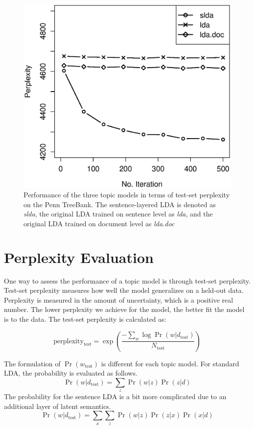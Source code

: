 \begin{figure}[!ht]
  \centering
  \includegraphics[width=\columnwidth]{ppl.eps}
  \caption{Performance of the three topic models in terms of test-set
  perplexity on the Penn TreeBank.  The sentence-layered LDA is denoted as {\it
  slda}, the original LDA trained on sentence level as {\it lda}, and the
  original LDA trained on document level as {\it lda.doc} }
  \label{f:perplexity}
\end{figure}

\section{Perplexity Evaluation} \label{s:perplexity-evaluation}

One way to assess the performance of a topic model is through test-set
perplexity.  Test-set perplexity measures how well the model generalizes on a
held-out data.  Perplexity is measured in the amount of uncertainty, which is a
positive real number.  The lower perplexity we achieve for the model, the
better fit the model is to the data.  The test-set perplexity is calculated as:

\[ \mathrm{perplexity_{test}} = \exp(\frac{- \sum_w \log \Pr(w|d_\mathrm{test})}{N_\mathrm{test}}) \]

The formulation of $\Pr(w_\mathrm{test})$ is different for each topic model.
For standard LDA, the probability is evaluated as follows.  \[
\Pr(w|d_\mathrm{test}) = \sum_z \Pr(w|z) \Pr(z|d) \] The probability for the
sentence LDA is a bit more complicated due to an additional layer of latent
semantics.  \[ \Pr(w|d_\mathrm{test}) = \sum_x \sum_z \Pr(w|z) \Pr(z|x)
\Pr(x|d) \] 

